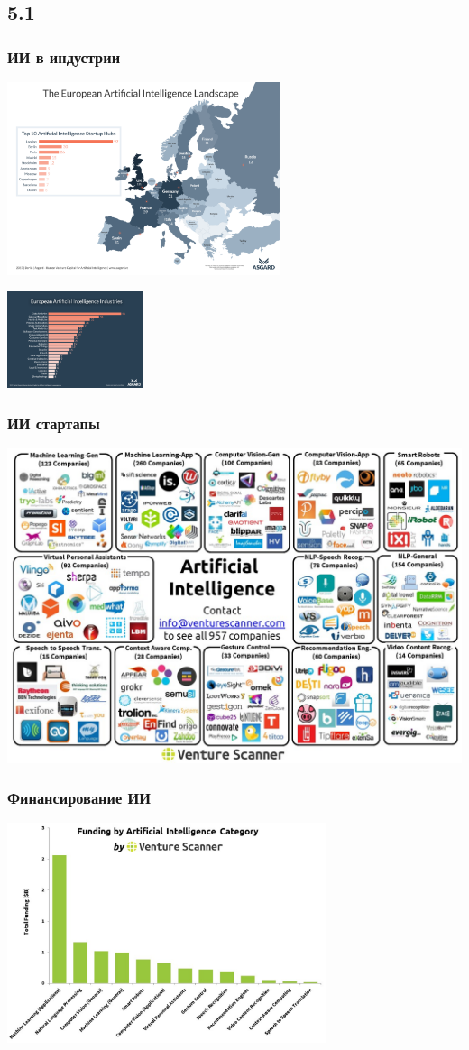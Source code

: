 \documentclass[default]{beamer}
\begin{document}
	\subsection{5.1}
	\begin{frame}
		\frametitle{ИИ в индустрии}
		\centering
		\includegraphics[width=0.6\textwidth]{asgard_1.png}
		\par\bigskip
		\includegraphics[width=0.3\textwidth]{asgard_2.png}
	\end{frame}

	\begin{frame}
		\frametitle{ИИ стартапы}
		\centering
		\includegraphics[width=\textwidth]{ai_startups.jpg}
	\end{frame}

	\begin{frame}
		\frametitle{Финансирование ИИ}
		\centering
		\includegraphics[width=0.7\textwidth]{ai_fund.jpg}
	\end{frame}
\end{document}
